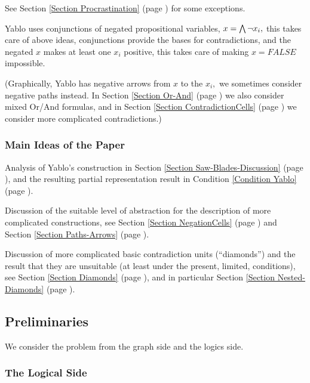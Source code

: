 See Section 
\ref{Section Procrastination} (page 
\pageref{Section Procrastination})  for some exceptions.

 \xDH
Yablo uses conjunctions of negated propositional variables,
$x= \bigwedge \neg x_{i},$ this takes
care of above ideas, conjunctions provide the bases for contradictions,
and the negated $x$ makes at least one $x_{i}$ positive, this takes care
of
making $x=FALSE$ impossible.

 \xEj

(Graphically, Yablo has negative arrows from $x$ to the $x_{i},$ we
sometimes
consider negative paths instead.
In Section \ref{Section Or-And} (page \pageref{Section Or-And})
we also consider mixed Or/And formulas, and in
Section 
\ref{Section ContradictionCells} (page 
\pageref{Section ContradictionCells})
we consider more complicated contradictions.)
\subsubsection{
Main Ideas of the Paper
}


 \xEh
 \xDH
Analysis of Yablo's construction in
Section 
\ref{Section Saw-Blades-Discussion} (page 
\pageref{Section Saw-Blades-Discussion}), and the
resulting partial representation result in
Condition \ref{Condition Yablo} (page \pageref{Condition Yablo}).

 \xDH
Discussion of the suitable level of abstraction for the description
of more complicated constructions, see
Section \ref{Section NegationCells} (page \pageref{Section NegationCells})  and
Section \ref{Section Paths-Arrows} (page \pageref{Section Paths-Arrows}).

 \xDH
Discussion of more complicated basic contradiction units
(``diamonds'') and the result that they are unsuitable
(at least under the present, limited, conditions), see
Section 
\ref{Section Diamonds} (page 
\pageref{Section Diamonds}), and in particular
Section \ref{Section Nested-Diamonds} (page \pageref{Section Nested-Diamonds}).

 \xEj
\subsection{
Preliminaries
}


\label{Section Preliminaries-XBA}


We consider the problem from the graph side and the logics side.
\subsubsection{
The Logical Side
}


